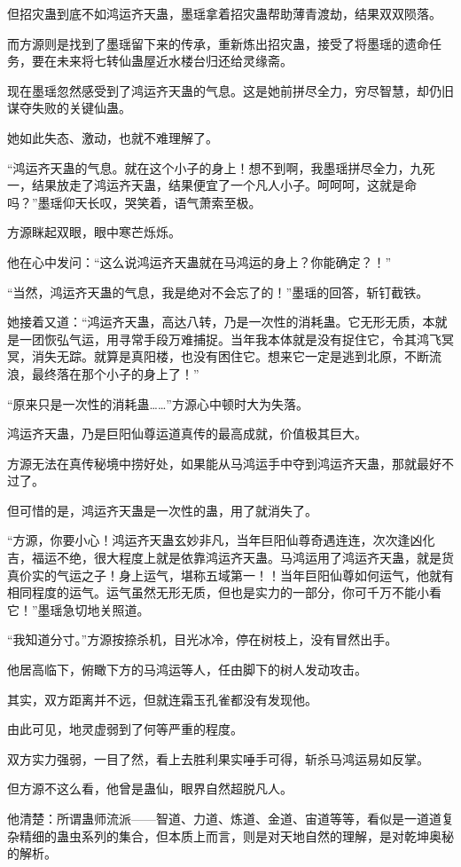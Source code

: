 \begin{this_body}
但招灾蛊到底不如鸿运齐天蛊，墨瑶拿着招灾蛊帮助薄青渡劫，结果双双陨落。

而方源则是找到了墨瑶留下来的传承，重新炼出招灾蛊，接受了将墨瑶的遗命任务，要在未来将七转仙蛊屋近水楼台归还给灵缘斋。

现在墨瑶忽然感受到了鸿运齐天蛊的气息。这是她前拼尽全力，穷尽智慧，却仍旧谋夺失败的关键仙蛊。

她如此失态、激动，也就不难理解了。

“鸿运齐天蛊的气息。就在这个小子的身上！想不到啊，我墨瑶拼尽全力，九死一，结果放走了鸿运齐天蛊，结果便宜了一个凡人小子。呵呵呵，这就是命吗？”墨瑶仰天长叹，哭笑着，语气萧索至极。

方源眯起双眼，眼中寒芒烁烁。

他在心中发问：“这么说鸿运齐天蛊就在马鸿运的身上？你能确定？！”

“当然，鸿运齐天蛊的气息，我是绝对不会忘了的！”墨瑶的回答，斩钉截铁。

她接着又道：“鸿运齐天蛊，高达八转，乃是一次性的消耗蛊。它无形无质，本就是一团恢弘气运，用寻常手段万难捕捉。当年我本体就是没有捉住它，令其鸿飞冥冥，消失无踪。就算是真阳楼，也没有困住它。想来它一定是逃到北原，不断流浪，最终落在那个小子的身上了！”

“原来只是一次性的消耗蛊……”方源心中顿时大为失落。

鸿运齐天蛊，乃是巨阳仙尊运道真传的最高成就，价值极其巨大。

方源无法在真传秘境中捞好处，如果能从马鸿运手中夺到鸿运齐天蛊，那就最好不过了。

但可惜的是，鸿运齐天蛊是一次性的蛊，用了就消失了。

“方源，你要小心！鸿运齐天蛊玄妙非凡，当年巨阳仙尊奇遇连连，次次逢凶化吉，福运不绝，很大程度上就是依靠鸿运齐天蛊。马鸿运用了鸿运齐天蛊，就是货真价实的气运之子！身上运气，堪称五域第一！！当年巨阳仙尊如何运气，他就有相同程度的运气。运气虽然无形无质，但也是实力的一部分，你可千万不能小看它！”墨瑶急切地关照道。

“我知道分寸。”方源按捺杀机，目光冰冷，停在树枝上，没有冒然出手。

他居高临下，俯瞰下方的马鸿运等人，任由脚下的树人发动攻击。

其实，双方距离并不远，但就连霜玉孔雀都没有发现他。

由此可见，地灵虚弱到了何等严重的程度。

双方实力强弱，一目了然，看上去胜利果实唾手可得，斩杀马鸿运易如反掌。

但方源不这么看，他曾是蛊仙，眼界自然超脱凡人。

他清楚：所谓蛊师流派——智道、力道、炼道、金道、宙道等等，看似是一道道复杂精细的蛊虫系列的集合，但本质上而言，则是对天地自然的理解，是对乾坤奥秘的解析。


\end{this_body}
